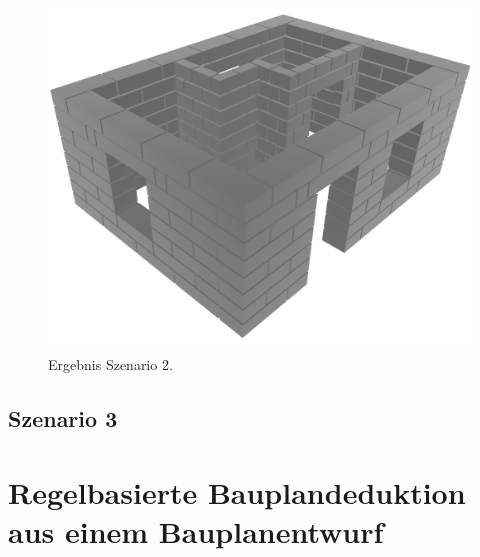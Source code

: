 \begin{figure}[ht!]
  \centering
  \includegraphics[width=0.6\columnwidth]{fig/scenario2_render.png}
  \caption{Ergebnis Szenario 2.}\label{fig:poc:scenario2 ergebnis}
\end{figure}

\subsection{Szenario 3}\label{poc:scenario3}
\section{Regelbasierte Bauplandeduktion aus einem Bauplanentwurf}